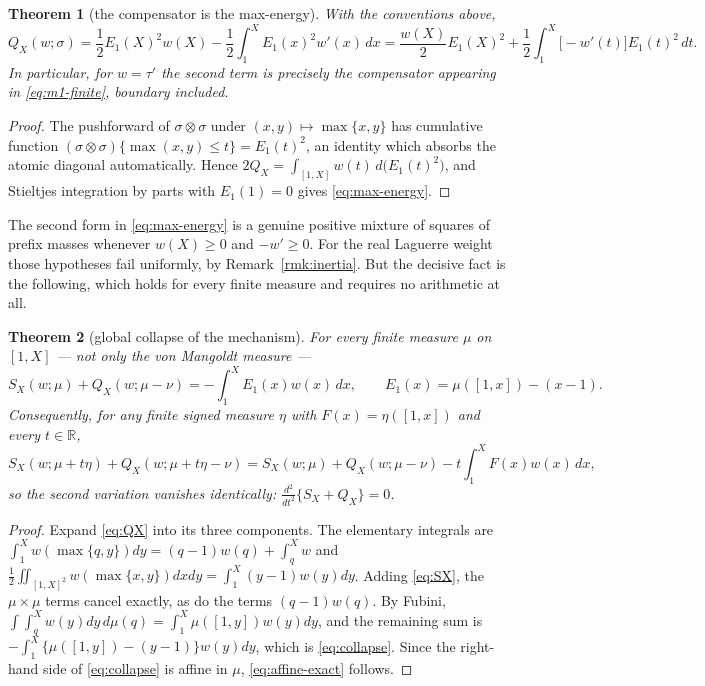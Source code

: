 \documentclass[11pt]{amsart}
\newtheorem{theorem}{Theorem}[section]
\theoremstyle{definition}
\theoremstyle{remark}
\theoremstyle{definition}
\newcommand{\R}{\mathbb{R}}
\begin{document}
\begin{theorem}[the compensator is the max-energy]\label{thm:max-energy}
With the conventions above,
\begin{equation}\label{eq:max-energy}
   Q_X(w;\sigma)=\frac12E_1(X)^2w(X)-\frac12\int_1^XE_1(x)^2w'(x)\,dx
   =\frac{w(X)}{2}E_1(X)^2+\frac12\int_1^X\bigl[-w'(t)\bigr]E_1(t)^2\,dt .
\end{equation}
In particular, for $w=\tau'$ the second term is precisely the compensator appearing in
\eqref{eq:m1-finite}, boundary included.
\end{theorem}

\begin{proof}
The pushforward of $\sigma\otimes\sigma$ under $(x,y)\mapsto\max\{x,y\}$ has cumulative function
$(\sigma\otimes\sigma)\{\max(x,y)\le t\}=E_1(t)^2$, an identity which absorbs the atomic diagonal
automatically. Hence $2Q_X=\int_{[1,X]}w(t)\,d\bigl(E_1(t)^2\bigr)$, and Stieltjes integration by
parts with $E_1(1)=0$ gives \eqref{eq:max-energy}.
\end{proof}

The second form in \eqref{eq:max-energy} is a genuine positive mixture of squares of prefix
masses whenever $w(X)\ge0$ and $-w'\ge0$. For the real Laguerre weight those hypotheses fail
uniformly, by Remark~\ref{rmk:inertia}. But the decisive fact is the following, which holds for
every finite measure and requires no arithmetic at all.

\begin{theorem}[global collapse of the mechanism]\label{thm:hessian-zero}
For every finite measure $\mu$ on $[1,X]$ --- not only the von Mangoldt measure ---
\begin{equation}\label{eq:collapse}
   S_X(w;\mu)+Q_X(w;\mu-\nu)=-\int_1^XE_1(x)w(x)\,dx ,
   \qquad E_1(x)=\mu([1,x])-(x-1).
\end{equation}
Consequently, for any finite signed measure $\eta$ with $F(x)=\eta([1,x])$ and every $t\in\R$,
\begin{equation}\label{eq:affine-exact}
   S_X(w;\mu+t\eta)+Q_X(w;\mu+t\eta-\nu)
   =S_X(w;\mu)+Q_X(w;\mu-\nu)-t\int_1^XF(x)w(x)\,dx ,
\end{equation}
so the second variation vanishes identically:
$\tfrac{d^2}{dt^2}\bigl\{S_X+Q_X\bigr\}=0$.
\end{theorem}

\begin{proof}
Expand \eqref{eq:QX} into its three components. The elementary integrals are
$\int_1^Xw(\max\{q,y\})dy=(q-1)w(q)+\int_q^Xw$ and
$\tfrac12\iint_{[1,X]^2}w(\max\{x,y\})dxdy=\int_1^X(y-1)w(y)dy$. Adding \eqref{eq:SX}, the
$\mu\times\mu$ terms cancel exactly, as do the terms $(q-1)w(q)$. By Fubini,
$\int\int_q^Xw(y)dy\,d\mu(q)=\int_1^X\mu([1,y])w(y)dy$, and the remaining sum is
$-\int_1^X\{\mu([1,y])-(y-1)\}w(y)dy$, which is \eqref{eq:collapse}. Since the right-hand side of
\eqref{eq:collapse} is affine in $\mu$, \eqref{eq:affine-exact} follows.
\end{proof}
\end{document}
